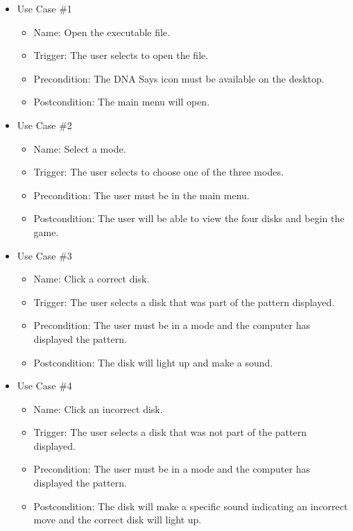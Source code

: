 \documentclass[12pt, titlepage]{article}
\begin{document}
\begin{itemize}

\item Use Case \#1
\begin{itemize}
\item Name: Open the executable file.
\item Trigger: The user selects to open the file.
\item Precondition: The DNA Says icon must be available on the desktop.
\item Postcondition: The main menu will open.
\end{itemize}

\item Use Case \#2
\begin{itemize}
\item Name: Select a mode.
\item Trigger: The user selects to choose one of the three modes.
\item Precondition: The user must be in the main menu.
\item Postcondition: The user will be able to view the four disks and begin the game.
\end{itemize}

\item Use Case \#3
\begin{itemize}
\item Name: Click a correct disk.
\item Trigger: The user selects a disk that was part of the pattern displayed. 
\item Precondition: The user must be in a mode and the computer has displayed the pattern.
\item Postcondition: The disk will light up and make a sound.
\end{itemize}

\item Use Case \#4
\begin{itemize}
\item Name: Click an incorrect disk.
\item Trigger: The user selects a disk that was not part of the pattern displayed.
\item Precondition: The user must be in a mode and the computer has displayed the pattern.
\item Postcondition: The disk will make a specific sound indicating an incorrect move and the correct disk will light up.
\end{itemize}


\end{itemize}
\end{document}
